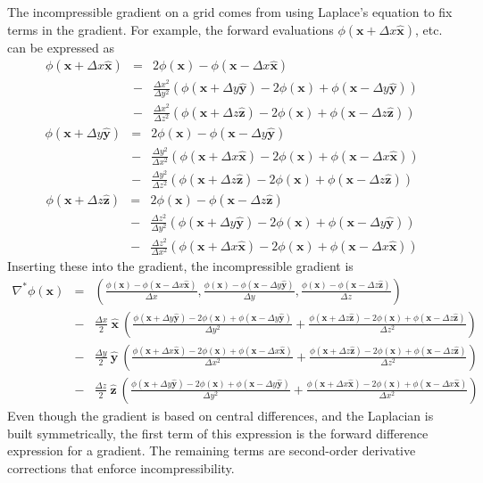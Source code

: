 \documentclass{article}
\def\xvec{\textbf{x}}
\def\dx{\Delta x}
\def\dy{\Delta y}
\def\inabla{\nabla^{*}}
\def\dx{\Delta x}
\def\dy{\Delta y}
\def\dz{\Delta z}
\def\xhat{\hat{\textbf{x}}}
\def\yhat{\hat{\textbf{y}}}
\def\zhat{\hat{\textbf{z}}}
\begin{document}
The incompressible gradient on a grid comes from using Laplace's equation to fix terms in the gradient. For example, the forward evaluations $\phi(\xvec+\dx\xhat)$, etc. can be expressed as
\begin{eqnarray}
 \phi(\xvec + \dx \xhat) &=& 2\phi(\xvec) - \phi(\xvec - \dx \xhat) \nonumber \\
&-& \frac{\dx^2}{\dy^2}\left( \phi(\xvec + \dy \yhat) -2\phi(\xvec) + \phi(\xvec - \dy \yhat) \right) \nonumber \\
&-& \frac{\dx^2}{\dz^2}\left(   \phi(\xvec + \dz \zhat) -2\phi(\xvec) + \phi(\xvec - \dz \zhat) \right)
\end{eqnarray}
\begin{eqnarray}
\phi(\xvec + \dy \yhat) &=& 2\phi(\xvec) - \phi(\xvec - \dy \yhat) \nonumber \\
&-& \frac{\dy^2}{\dx^2}\left( \phi(\xvec + \dx \xhat) -2\phi(\xvec) + \phi(\xvec - \dx \xhat) \right) \nonumber \\
&-& \frac{\dy^2}{\dz^2}\left(   \phi(\xvec + \dz \zhat) -2\phi(\xvec) + \phi(\xvec - \dz \zhat) \right)
\end{eqnarray}
\begin{eqnarray}
\phi(\xvec + \dz \zhat) &=& 2\phi(\xvec) - \phi(\xvec - \dz \zhat) \nonumber \\
&-& \frac{\dz^2}{\dy^2}\left( \phi(\xvec + \dy \yhat) -2\phi(\xvec) + \phi(\xvec - \dy \yhat) \right) \nonumber \\
&-& \frac{\dz^2}{\dx^2}\left(   \phi(\xvec + \dx \xhat) -2\phi(\xvec) + \phi(\xvec - \dx \xhat) \right)
\end{eqnarray}
Inserting these into the gradient, the incompressible gradient is
\begin{eqnarray}
\inabla\phi(\xvec) &=& \left(  \frac{\phi(\xvec) - \phi(\xvec - \dx \xhat) }{\dx},
  \frac{\phi(\xvec) - \phi(\xvec - \dy \yhat) }{\dy}, 
  \frac{\phi(\xvec) - \phi(\xvec - \dz \zhat) }{\dz}  \right)  
\label{gridigrad} \\
&-& \frac{\dx}{2}\ \xhat\ \left( \frac{ \phi(\xvec + \dy \yhat) -2\phi(\xvec) + \phi(\xvec - \dy \yhat)}{\dy^2} +  \frac{ \phi(\xvec + \dz \zhat) -2\phi(\xvec) + \phi(\xvec - \dz \zhat)}{\dz^2} \right) \nonumber \\
&-& \frac{\dy}{2}\ \yhat\ \left( \frac{ \phi(\xvec + \dx \xhat) -2\phi(\xvec) + \phi(\xvec - \dx \xhat)}{\dx^2} +  \frac{ \phi(\xvec + \dz \zhat) -2\phi(\xvec) + \phi(\xvec - \dz \zhat)}{\dz^2} \right) \nonumber \\
&-& \frac{\dz}{2}\ \zhat\ \left( \frac{ \phi(\xvec + \dy \yhat) -2\phi(\xvec) + \phi(\xvec - \dy \yhat)}{\dy^2} +  \frac{ \phi(\xvec + \dx \xhat) -2\phi(\xvec) + \phi(\xvec - \dx \xhat)}{\dx^2} \right) \nonumber 
\end{eqnarray}
Even though the gradient is based on central differences, and the Laplacian is built symmetrically, the first term of this expression is the forward difference expression for a gradient.  The remaining terms are second-order derivative corrections that enforce incompressibility.
\end{document}

